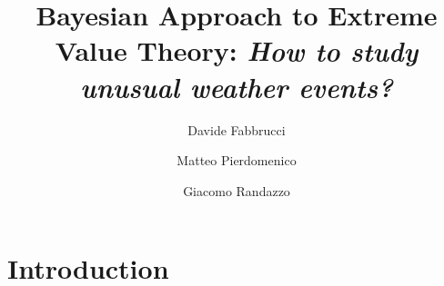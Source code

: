\documentclass[preprint,12pt]{elsarticle}
\begin{document}
\begin{frontmatter}



\title{Bayesian Approach to Extreme Value Theory:                                 
\hspace{40pt} \large{\textit{How to study unusual weather events?}}}


\author{Davide Fabbrucci}
\author{Matteo Pierdomenico}
\author{Giacomo Randazzo} 


\begin{abstract}
 

\end{abstract}

\begin{keyword}
\end{keyword}

\end{frontmatter}




\section{Introduction}
\label{S:1}
\end{document}
